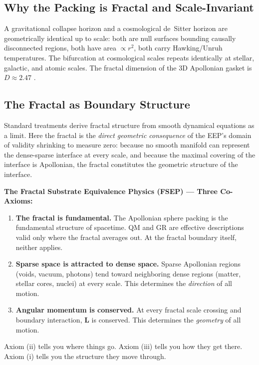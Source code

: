 \documentclass[11pt,letterpaper]{article}
\begin{document}
\subsection{Why the Packing is Fractal and Scale-Invariant}
A gravitational collapse horizon and a cosmological de~Sitter horizon are
geometrically identical up to scale: both are null surfaces bounding causally
disconnected regions, both have area $\propto r^2$, both carry Hawking/Unruh
temperatures. The bifurcation at cosmological scales repeats identically at stellar,
galactic, and atomic scales. The fractal dimension of the 3D Apollonian gasket is
$D\approx 2.47$ \cite{Borkovec1994}.

\subsection{The Fractal as Boundary Structure}
Standard treatments derive fractal structure from smooth dynamical equations as a
limit. Here the fractal is the \textit{direct geometric consequence} of the EEP's
domain of validity shrinking to measure zero: because no smooth manifold can
represent the dense-sparse interface at every scale, and because the maximal
covering of the interface is Apollonian, the fractal constitutes the geometric
structure of the interface.

\begin{mdframed}
\textbf{The Fractal Substrate Equivalence Physics (FSEP) --- Three Co-Axioms:}
\begin{enumerate}
\item \textbf{The fractal is fundamental.} The Apollonian sphere packing is the
fundamental structure of spacetime. QM and GR are effective descriptions valid only
where the fractal averages out. At the fractal boundary itself, neither applies.
\item \textbf{Sparse space is attracted to dense space.} Sparse Apollonian regions
(voids, vacuum, photons) tend toward neighboring dense regions (matter, stellar
cores, nuclei) at every scale. This determines the \textit{direction} of all
motion.
\item \textbf{Angular momentum is conserved.} At every fractal scale crossing and
boundary interaction, $\mathbf{L}$ is conserved. This determines the
\textit{geometry} of all motion.
\end{enumerate}
Axiom (ii) tells you where things go. Axiom (iii) tells you how they get there.
Axiom (i) tells you the structure they move through.
\end{mdframed}
\end{document}
